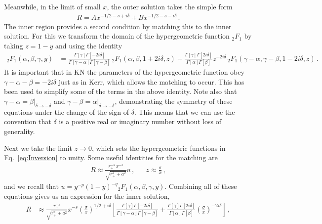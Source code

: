 \begin{refsection}
Meanwhile, in the limit of small $x$, the outer solution takes the simple form
\begin{align}
R = A x^{-1/2 - s + i \delta} + B x^{-1/2 -s - i \delta} \,.
\end{align}
The inner region provides a second condition by matching this to the inner solution. For this we transform the domain of the hypergeometric function  ${}_2 F_1$ by taking $z = 1-y$ and using the identity~\cite{nist}
\begin{align}
\label{eq:Inversion}
{}_2 F_1( \alpha, \beta, \gamma, y) & = \frac{\Gamma[\gamma] \Gamma[-2 i \delta]}{\Gamma[\gamma- \alpha]\Gamma[\gamma-\beta]} \,{}_2 F_1(\alpha, \beta, 1+ 2 i \delta, z) + \frac{\Gamma[\gamma]\Gamma[2 i \delta]}{\Gamma[\alpha]\Gamma[\beta]} z^{-2 i \delta} \,{}_2 F_1(\gamma - \alpha, \gamma -\beta, 1 -2 i \delta, z) \,.
\end{align}
It is important that in KN the parameters of the hypergeometric function obey $\gamma - \alpha - \beta = - 2 i \delta$ just as in Kerr, which allows the matching to occur. This has been used to simplify some of the terms in the above identity.
Note also that $\gamma - \alpha  = \beta|_{\delta \to -\delta}$ and $ \gamma - \beta = \alpha|_{\delta \to -\delta}$, demonstrating the symmetry of these equations under the change of the sign of $\delta$. 
This means that we can use the convention that $\delta$ is a positive real or imaginary number without loss of generality.

Next we take the limit $z \to 0$, which sets the hypergeometric functions in Eq.~\eqref{eq:Inversion} to unity.
Some useful identities for the matching are
\begin{align}
R  \approx \frac{r_+^{-s} \, x^{-s}}{\sqrt{r_+^2 +a^2}} u \,, && z \approx \frac{\sigma}{x} \,,
\end{align}
and we recall that $u = y^{-p} (1-y)^{-q} {}_2 F_1(\alpha, \beta, \gamma, y)$. 
Combining all of these equations gives us an expression for the inner solution,
\begin{align}
\label{eq:innmatch}
R & \approx \frac{r_+^{-s}}{\sqrt{r_+^2 +a^2}} x^{-s} \left(\frac{\sigma}{x} \right)^{1/2+i\delta} \left [\frac{\Gamma[\gamma] \Gamma[-2 i \delta]}{\Gamma[\gamma- \alpha]\Gamma[\gamma-\beta]} + \frac{\Gamma[\gamma]\Gamma[2 i \delta]}{\Gamma[\alpha]\Gamma[\beta]}\left( \frac{\sigma}{x}\right)^{-2 i \delta} \right] \,,
\end{align}



\end{refsection}
